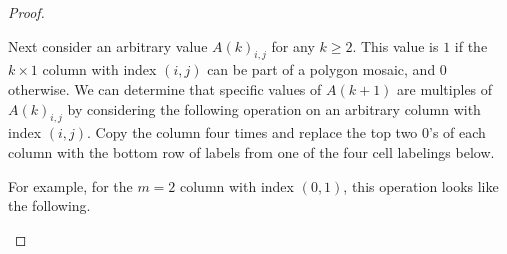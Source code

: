 \begin{proof}
\begin{center}
\end{center}

Next consider an arbitrary value $A(k)_{i,j}$ for any $k \geq 2$. This value is $1$ if the $k \times 1$ column with index $(i,j)$ can be part of a polygon mosaic, and $0$ otherwise. We can determine that specific values of $A(k+1)$ are multiples of $A(k)_{i,j}$ by considering the following operation on an arbitrary column with index $(i,j)$. Copy the column four times and replace the top two $0$'s of each column with the bottom row of labels from one of the four cell labelings below. 

\begin{center}
\end{center}

For example, for the $m=2$ column with index $(0,1)$, this operation looks like the following.

\begin{center}
\end{center}
\end{proof}
